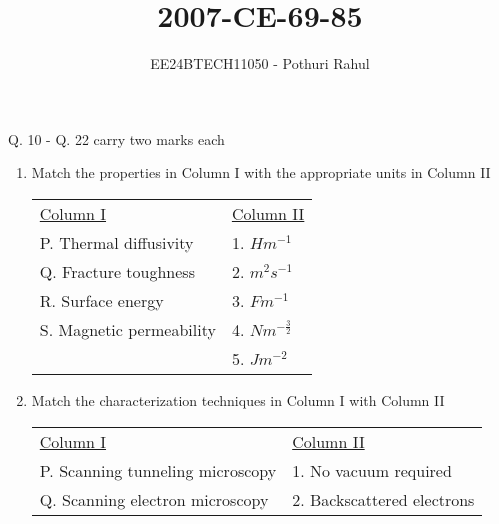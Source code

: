 \documentclass[journal]{IEEEtran}
\begin{document}

\vspace{3cm}
\title{2007-CE-69-85}
\author{EE24BTECH11050 - Pothuri Rahul}
{\let\newpage\relax\maketitle}
\renewcommand{\thefigure}{\theenumi}
\renewcommand{\thetable}{\theenumi}
\setlength{\intextsep}{10pt} %
\renewcommand{\thetable}{\theenumi}
Q. 10 - Q. 22 carry two marks each \\
\begin{enumerate}[start=10]
\item %
Match the properties in Column I with the appropriate units in Column II \\
\begin{tabular}{l l}
\underline{Column I} & \underline{Column II} \\
P. Thermal diffusivity   & 1. $Hm^{-1}$ \\
Q. Fracture toughness    & 2. $m^2s^{-1}$ \\
R. Surface energy        & 3. $Fm^{-1}$ \\
S. Magnetic permeability & 4. $Nm^{-\frac{3}{2}}$ \\
                        & 5. $Jm^{-2}$
\end{tabular}
\begin{enumerate}
\end{enumerate}
\item %
Match the characterization techniques in Column I with Column II \\
\begin{tabular}{l l}
\underline{Column I} & \underline{Column II} \\
P. Scanning tunneling microscopy & 1. No vacuum required \\
Q. Scanning electron microscopy & 2. Backscattered electrons \\

\end{tabular}
\end{enumerate}
\end{document}
